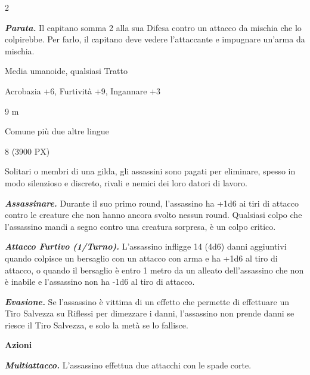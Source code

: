 \begin{multicols}{2}
{\emph{\textbf{Parata.}} Il capitano somma 2 alla sua Difesa contro un attacco da mischia che lo colpirebbe. Per farlo, il capitano deve vedere l'attaccante e impugnare un'arma da mischia.

\begin{description}[noitemsep, topsep=0pt, parsep=0pt, partopsep=0pt, itemsep=1pt, leftmargin=2.35cm,  labelwidth=2.2cm, itemindent=0cm, listparindent=0pt] %
\setlength{\baselineskip}{10pt}
\item[\textbf{Taglia/Tipo}] Media umanoide, qualsiasi Tratto
\item[\textbf{Caratt.}] 
\item[\textbf{Punti Ferita}] 
\item[\textbf{Comp.}] Acrobazia +6, Furtività +9, Ingannare +3
\item[\textbf{Tiri Salvez.}] 
\item[\textbf{Movimento}] 9 m
\item[\textbf{Linguaggi}] Comune più due altre lingue
\item[\textbf{Sfida}] 8 (3900 PX)
\end{description}
\smallskip

Solitari o membri di una gilda, gli assassini sono pagati per eliminare, spesso in modo silenzioso e discreto, rivali e nemici dei loro datori di lavoro.

\emph{\textbf{Assassinare.}} Durante il suo primo round, l'assassino ha +1d6 ai tiri di attacco contro le creature che non hanno ancora svolto nessun round. Qualsiasi colpo che l'assassino mandi a segno contro una creatura sorpresa, è un colpo critico.

\emph{\textbf{Attacco Furtivo (1/Turno).}} L'assassino infligge 14 (4d6) danni aggiuntivi quando colpisce un bersaglio con un attacco con arma e ha +1d6 al tiro di attacco, o quando il bersaglio è entro 1 metro da un alleato dell'assassino che non è inabile e l'assassino non ha -1d6 al tiro di attacco.

\emph{\textbf{Evasione.}} Se l'assassino è vittima di un effetto che permette di effettuare un Tiro Salvezza su Riflessi per dimezzare i danni, l'assassino non prende danni se riesce il Tiro Salvezza, e solo la metà se lo fallisce.

\textbf{Azioni}

\emph{\textbf{Multiattacco.}} L'assassino effettua due attacchi con le spade corte.

}
\end{multicols}
